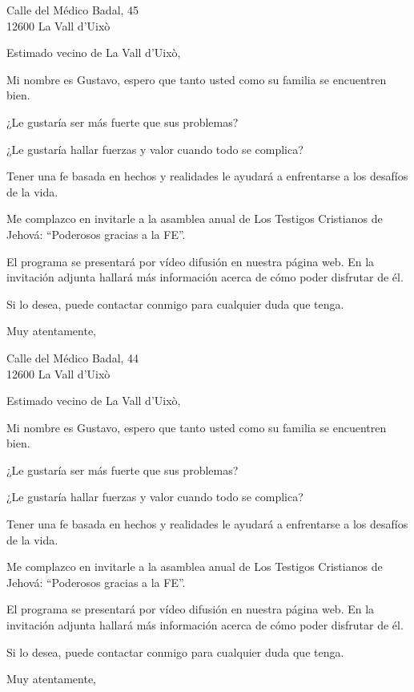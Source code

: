 \documentclass{scrlttr2}
\begin{document}
\begin{letter}{%
Calle del Médico Badal, 45\\
12600 La Vall d'Uixò\\
}
\opening{Estimado vecino de La Vall d'Uixò,}

Mi nombre es Gustavo, espero que tanto usted como su familia se encuentren bien.

¿Le gustaría ser más fuerte que sus problemas?

¿Le gustaría hallar fuerzas y valor cuando todo se complica?

Tener una fe basada en hechos y realidades le ayudará a enfrentarse a los desafíos de la vida.

Me complazco en invitarle a la asamblea anual de Los Testigos Cristianos de Jehová: ``Poderosos gracias a la FE''.

El programa se presentará por vídeo difusión en nuestra página web. En la invitación adjunta hallará más información acerca de cómo poder disfrutar de él.

Si lo desea, puede contactar conmigo para cualquier duda que tenga.

\closing{Muy atentamente,}


\end{letter}
\begin{letter}{%
Calle del Médico Badal, 44\\
12600 La Vall d'Uixò\\
}
\opening{Estimado vecino de La Vall d'Uixò,}

Mi nombre es Gustavo, espero que tanto usted como su familia se encuentren bien.

¿Le gustaría ser más fuerte que sus problemas?

¿Le gustaría hallar fuerzas y valor cuando todo se complica?

Tener una fe basada en hechos y realidades le ayudará a enfrentarse a los desafíos de la vida.

Me complazco en invitarle a la asamblea anual de Los Testigos Cristianos de Jehová: ``Poderosos gracias a la FE''.

El programa se presentará por vídeo difusión en nuestra página web. En la invitación adjunta hallará más información acerca de cómo poder disfrutar de él.

Si lo desea, puede contactar conmigo para cualquier duda que tenga.

\closing{Muy atentamente,}


\end{letter}
\end{document}

